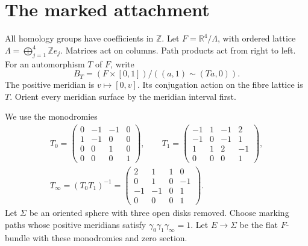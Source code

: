 \section{The marked attachment}

All homology groups have coefficients in $\mathbb Z$.
Let $F=\mathbb R^4/\Lambda$, with ordered lattice
$\Lambda=\bigoplus_{j=1}^4\mathbb Ze_j$.
Matrices act on columns. Path products act from right to left.
For an automorphism $T$ of $F$, write
\[
B_T=(F\times[0,1])/((a,1)\sim(Ta,0)).
\]
The positive meridian is $v\mapsto[0,v]$.
Its conjugation action on the fibre lattice is $T$.
Orient every meridian surface by the meridian interval first.

We use the monodromies
\begin{equation}\label{mt:eq:monodromy}
\begin{gathered}
T_0=\begin{pmatrix}0&-1&-1&0\\1&-1&0&0\\0&0&1&0\\0&0&0&1\end{pmatrix},\qquad
T_1=\begin{pmatrix}-1&1&-1&2\\-1&0&-1&1\\1&1&2&-1\\0&0&0&1\end{pmatrix},\\
T_\infty=(T_0T_1)^{-1}
=\begin{pmatrix}2&1&1&0\\0&1&0&-1\\-1&-1&0&1\\0&0&0&1\end{pmatrix}.
\end{gathered}
\end{equation}
Let $\Sigma$ be an oriented sphere with three open disks removed.
Choose marking paths whose positive meridians satisfy
$\gamma_0\gamma_1\gamma_\infty=1$.
Let $E\to\Sigma$ be the flat $F$-bundle with these monodromies and zero section.

